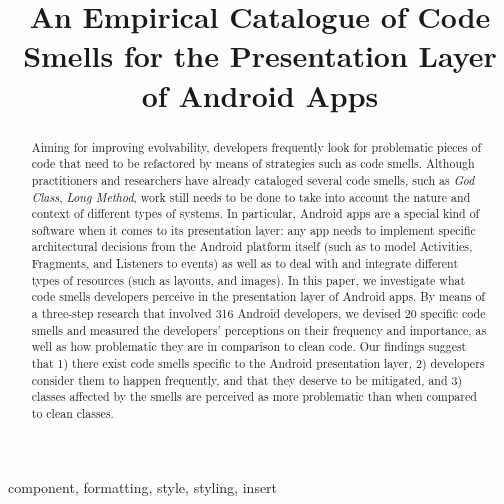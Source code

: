 \documentclass[conference]{IEEEtran}
\begin{document}
\title{An Empirical Catalogue of Code Smells for the Presentation Layer of Android Apps}

\author{
\and
{}
\and
{}
}

\maketitle

\begin{abstract} 

Aiming for improving evolvability, developers frequently look for problematic pieces of code that need to be refactored by means of strategies such as code smells. Although
practitioners and researchers have already cataloged several code smells, such as \textit{God Class}, \textit{Long Method}, work still needs to be done to take into account the nature and context of different types of systems. In particular, Android apps are a special kind of software
when it comes to its presentation layer:
any app needs to implement specific architectural decisions from the Android
platform itself (such as to model Activities, Fragments, and Listeners to events) 
as well as to deal with and integrate different types of resources (such as layouts, and images).
In this paper, we investigate what code smells developers perceive in the presentation
layer of Android apps. By means of a three-step research that involved 316 Android developers,
we devised 20 specific code smells and measured the developers' perceptions on their frequency and importance,
as well as how problematic they are in comparison to clean code.
Our findings suggest that 1) there exist code smells specific to the Android presentation layer, 
2) developers consider them to happen frequently, and that they deserve to be mitigated, and 
3) classes affected by the smells are perceived as more problematic than when compared to clean
classes. 


\end{abstract}

\begin{IEEEkeywords}
component, formatting, style, styling, insert
\end{IEEEkeywords}











\end{document}
